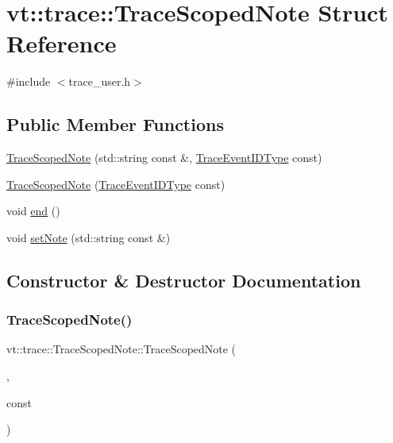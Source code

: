 \hypertarget{structvt_1_1trace_1_1_trace_scoped_note}{}\section{vt\+:\+:trace\+:\+:Trace\+Scoped\+Note Struct Reference}
\label{structvt_1_1trace_1_1_trace_scoped_note}


{\ttfamily \#include $<$trace\+\_\+user.\+h$>$}

\subsection*{Public Member Functions}
\begin{DoxyCompactItemize}
\item 
\hyperlink{structvt_1_1trace_1_1_trace_scoped_note_aee939d76350f541acfca783a447d8d0e}{Trace\+Scoped\+Note} (std\+::string const \&, \hyperlink{namespacevt_1_1trace_a64a7185f3e102df8d8258f263ccd1582}{Trace\+Event\+I\+D\+Type} const)
\item 
\hyperlink{structvt_1_1trace_1_1_trace_scoped_note_a34fcb799eee4d76258003e932f44f0cb}{Trace\+Scoped\+Note} (\hyperlink{namespacevt_1_1trace_a64a7185f3e102df8d8258f263ccd1582}{Trace\+Event\+I\+D\+Type} const)
\item 
void \hyperlink{structvt_1_1trace_1_1_trace_scoped_note_abfffe38b863ed36f508a3aecef7c094b}{end} ()
\item 
void \hyperlink{structvt_1_1trace_1_1_trace_scoped_note_a346cdee6ce247571c9e98c062d8c8d4e}{set\+Note} (std\+::string const \&)
\end{DoxyCompactItemize}


\subsection{Constructor \& Destructor Documentation}
\mbox{\label{structvt_1_1trace_1_1_trace_scoped_note_aee939d76350f541acfca783a447d8d0e}} 
\subsubsection{\texorpdfstring{Trace\+Scoped\+Note()}{TraceScopedNote()}\hspace{0.1cm}{\footnotesize\ttfamily [1/2]}}
{\footnotesize\ttfamily vt\+::trace\+::\+Trace\+Scoped\+Note\+::\+Trace\+Scoped\+Note (\begin{DoxyParamCaption}\item[{std\+::string const \&}]{,  }\item[{\hyperlink{namespacevt_1_1trace_a64a7185f3e102df8d8258f263ccd1582}{Trace\+Event\+I\+D\+Type}}]{const }\end{DoxyParamCaption})\hspace{0.3cm}{\ttfamily [inline]}}

